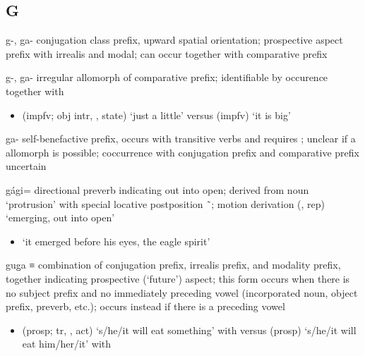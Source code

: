 \documentclass[12pt,letterpaper,oneside,article]{memoir}
\begin{document}
\subsection{G}\label{sec:alphalist-g}
\begin{morphdesc}[resume*=alphalist]
\item[g-, ga-]
	 conjugation class prefix, upward spatial orientation;
	prospective aspect prefix with  irrealis and  modal;
	can occur together with  comparative prefix

\item[g-, ga-]
	irregular allomorph of  comparative prefix;
	identifiable by occurence together with 
	\begin{itemize}
	\item	{} (impfv; obj intr, ,  state) ‘just a little’\newline
		versus  (impfv) ‘it is big’
	\end{itemize}

\item[ga-]
	self-benefactive prefix, occurs with transitive verbs and requires ;
	unclear if a  allomorph is possible;
	coccurrence with  conjugation prefix and  comparative prefix uncertain

\item[gági=]
	directional preverb indicating out into open;
	derived from noun  ‘protrusion’ with special locative postposition  \~\ ;
	motion derivation
			 (,  rep) ‘emerging, out into open’
	\begin{itemize}
	\item	{}
		‘it emerged before his eyes, the eagle spirit’
		\parencite[01/6]{leer:1973}
	\end{itemize}

\item[gug̱a]
	≡ 
	combination of  conjugation prefix,
		 irrealis prefix,
		and  modality prefix,
		together indicating prospective (‘future’) aspect;
	this form occurs when there is no subject prefix and no
		immediately preceding vowel (incorporated noun, object prefix, preverb, etc.);
	 occurs instead if there is a preceding vowel
	\begin{itemize}
	\item	{} (prosp; tr, ,  act) ‘s/he/it will eat something’
			with \newline
		versus  (prosp) ‘s/he/it will eat him/her/it’
			with 
	\end{itemize}
\end{morphdesc}
\end{document}
